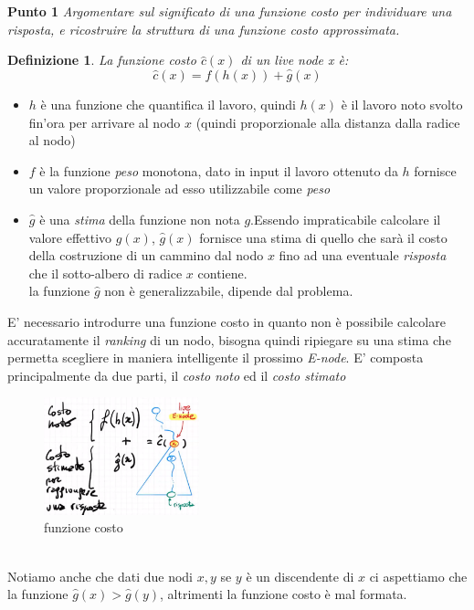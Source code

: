 \documentclass[a4paper]{article}
\newtheorem*{definition}{Definizione}
\begin{document}
\textbf{Punto 1}
\emph{Argomentare sul significato di una funzione costo per individuare una risposta, e ricostruire la struttura di una funzione costo approssimata.}
\begin{adjustwidth}{.8cm}{0cm}
\label{SEC:C3.1}
\begin{definition}
	La \textit{funzione costo} $\hat c(x)$ di un \textit{live node x} è: $$\hat c(x) = f(h(x)) + \hat g(x)$$
\end{definition}
\begin{itemize}
	\item$h$ è una funzione che quantifica il lavoro, quindi $h(x)$ è il lavoro noto svolto fin'ora per arrivare al nodo $x$ (quindi proporzionale alla distanza dalla radice al nodo)
	\item$f$ è la funzione \emph{peso} monotona, dato in input il lavoro ottenuto da $h$ fornisce un valore proporzionale ad esso utilizzabile come \emph{peso}
	\item$\hat g$ è una \textit{stima} della funzione non nota $g$.Essendo impraticabile calcolare il valore effettivo $g(x)$, $\hat g(x)$ fornisce una stima di quello che sarà il costo della costruzione di un cammino dal nodo $x$ fino ad una eventuale \textit{risposta} che il sotto-albero di radice $x$ contiene.\\
		la funzione $\hat g$ non è generalizzabile, dipende dal problema.
\end{itemize}
E' necessario introdurre una funzione costo in quanto non è possibile calcolare accuratamente il \textit{ranking} di un nodo, bisogna quindi ripiegare su una stima che permetta scegliere in maniera intelligente il prossimo \textit{E-node}.
E' composta principalmente da due parti, il \textit{costo noto} ed il \textit{costo stimato}\\
\begin{figure}[!ht]
\centering
\includegraphics[width=0.4\textwidth]{./img/C_3_punto1.png}
\caption{funzione costo} \label{FIG:C_3_punto1}
\end{figure}\\
Notiamo anche che dati due nodi $x,y$ se $y$ è un discendente di $x$ ci aspettiamo che la funzione $\hat g(x) > \hat g(y)$, altrimenti la funzione costo è mal formata.
\end{adjustwidth}
\end{document}
